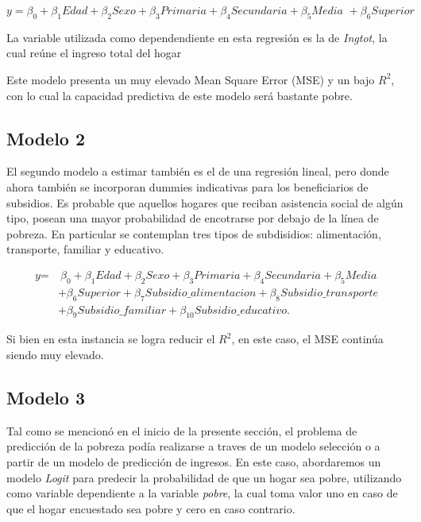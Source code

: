 \documentclass[11pt, a4paper]{article}
\begin{document}
\[
\textit{y}= \beta_0 + \beta_1 \textit{Edad}  + \beta_2 \textit{Sexo} + \beta_3 \textit{Primaria} +\beta_4 \textit{Secundaria} +\beta_5 \textit{Media } + \beta_6 \textit{Superior } 
\]

La variable utilizada como dependendiente en esta regresión es la de \textit{Ingtot}, la cual reúne el ingreso total del hogar 

Este modelo presenta un muy elevado Mean Square Error (MSE) y un bajo $R^2$, con lo cual la capacidad predictiva de este modelo será bastante pobre. 

\subsection*{Modelo 2}

El segundo modelo a estimar también es el de una regresión lineal, pero donde ahora también se incorporan dummies indicativas para los beneficiarios de subsidios. Es probable que aquellos hogares que reciban asistencia social de algún tipo, posean una mayor probabilidad de encotrarse por debajo de la línea de pobreza. En particular se contemplan tres tipos de subdisidios: alimentación, transporte, familiar y educativo. 

\[
\begin{aligned}
\textit{y} = &\ \beta_0 + \beta_1 \textit{Edad} + \beta_2 \textit{Sexo} + \beta_3 \textit{Primaria} 
+ \beta_4 \textit{Secundaria} + \beta_5 \textit{Media} \\
& + \beta_6 \textit{Superior} + \beta_7 \textit{Subsidio\_alimentacion} 
+ \beta_8 \textit{Subsidio\_transporte} \\
& + \beta_9 \textit{Subsidio\_familiar} + \beta_{10} \textit{Subsidio\_educativo}.
\end{aligned}
\]



Si bien en esta instancia se logra reducir el $R^2$, en este caso,  el MSE continúa siendo muy elevado. 

\subsection*{Modelo 3}

Tal como se mencionó en el inicio de la presente sección, el problema de predicción de la pobreza podía realizarse a traves de un modelo selección o a partir de un modelo de predicción de ingresos. En este caso, abordaremos un modelo \textit{Logit} para predecir la probabilidad de que un hogar sea pobre, utilizando como variable dependiente a la variable \textit{pobre}, la cual toma valor uno en caso de que el hogar encuestado sea pobre y cero en caso contrario. 
\end{document}

